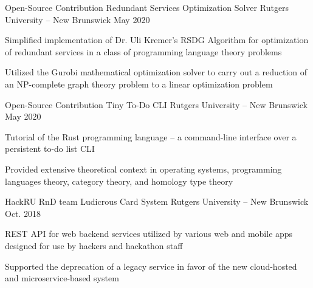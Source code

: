 
\begin{cventries}
  \cventry
  {Open-Source Contribution}
  {Redundant Services Optimization Solver}
  {Rutgers University -- New Brunswick}
  {May 2020}
  {
    \begin{cvitems}
    \item {Simplified implementation of Dr. Uli Kremer's RSDG Algorithm for optimization of redundant services in a class of programming language theory problems}
    \item {Utilized the Gurobi mathematical optimization solver to carry out a reduction of an NP-complete graph theory problem to a linear optimization problem}
    \end{cvitems}
  }

  \cventry
  {Open-Source Contribution}
  {Tiny To-Do CLI}
  {Rutgers University -- New Brunswick}
  {May 2020}
  {
    \begin{cvitems}
    \item {Tutorial of the Rust programming language -- a command-line interface over a persistent to-do list CLI}
    \item {Provided extensive theoretical context in operating systems, programming languages theory, category theory, and homology type theory}
    \end{cvitems}
  }

  \cventry
  {HackRU RnD team}
  {Ludicrous Card System}
  {Rutgers University -- New Brunswick}
  {Oct. 2018}
  {
    \begin{cvitems}
    \item {REST API for web backend services utilized by various web and mobile apps designed for use by hackers and hackathon staff}
    \item {Supported the deprecation of a legacy service in favor of the new cloud-hosted and microservice-based system}
    \end{cvitems}
  }
\end{cventries}
